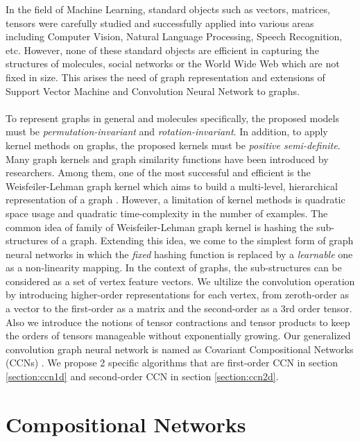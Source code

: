 \documentclass[sigchi]{acmart}
\theoremstyle{definition}
\theoremstyle{theorem}
\theoremstyle{corollary}
\theoremstyle{lemma}
\theoremstyle{remark}
\theoremstyle{prop}
\begin{document}
In the field of Machine Learning, standard objects such as vectors, matrices, tensors were carefully studied and successfully applied into various areas including Computer Vision, Natural Language Processing, Speech Recognition, etc. However, none of these standard objects are efficient in capturing the structures of molecules, social networks or the World Wide Web which are not fixed in size. This arises the need of graph representation and extensions of Support Vector Machine and Convolution Neural Network to graphs. \\ \\
To represent graphs in general and molecules specifically, the proposed models must be \textit{permutation-invariant} and \textit{rotation-invariant}. In addition, to apply kernel methods on graphs, the proposed kernels must be \textit{positive semi-definite}. Many graph kernels and graph similarity functions have been introduced by researchers. Among them, one of the most successful and efficient is the Weisfeiler-Lehman graph kernel which aims to build a multi-level, hierarchical representation of a graph \citep{Shervashidze2011}. However, a limitation of kernel methods is quadratic space usage and quadratic time-complexity in the number of examples. The common idea of family of Weisfeiler-Lehman graph kernel is hashing the sub-structures of a graph. Extending this idea, we come to the simplest form of graph neural networks in which the \textit{fixed} hashing function is replaced by a \textit{learnable} one as a non-linearity mapping. In the context of graphs, the sub-structures can be considered as a set of vertex feature vectors. We ultilize the convolution operation by introducing higher-order representations for each vertex, from zeroth-order as a vector to the first-order as a matrix and the second-order as a 3rd order tensor. Also we introduce the notions of tensor contractions and tensor products to keep the orders of tensors manageable without exponentially growing. Our generalized convolution graph neural network is named as Covariant Compositional Networks (CCNs) \citep{Kondor2018, Hy2018}. We propose 2 specific algorithms that are first-order CCN in section \ref{section:ccn1d} and second-order CCN in section \ref{section:ccn2d}. 

\section{Compositional Networks}
\end{document}
